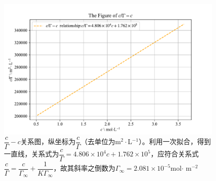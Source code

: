 \documentclass[UTF8,AutoFakeBold,a4paper]{article}
\begin{document}
\begin{figure}[h]
	\centering
	\includegraphics[scale=0.8]{Figure3}
	\caption{$\dfrac{c}{\varGamma}-c$关系图，纵坐标为$\dfrac{c}{\varGamma}$（去单位为m$^{2}\cdot$L$^{-1}$）。利用一次拟合，得到一直线，关系式为\textcolor[rgb]{0.54,0.13,0.33}{$\dfrac{c}{\varGamma} = 4.806 \times 10^{4}c + 1.762 \times 10^{5}$}，应符合关系式\textcolor[rgb]{0.07,0.36,0.57}{$\dfrac{c}{\varGamma} = \dfrac{c}{\varGamma_{\infty}}+\dfrac{1}{K\varGamma_{\infty}}$}，故其斜率之倒数为$\varGamma_{\infty} = 2.081 \times10^{-5}$mol$\cdot$ m$^{-2}$}
	\label{fi4}
\end{figure}
\end{document}
